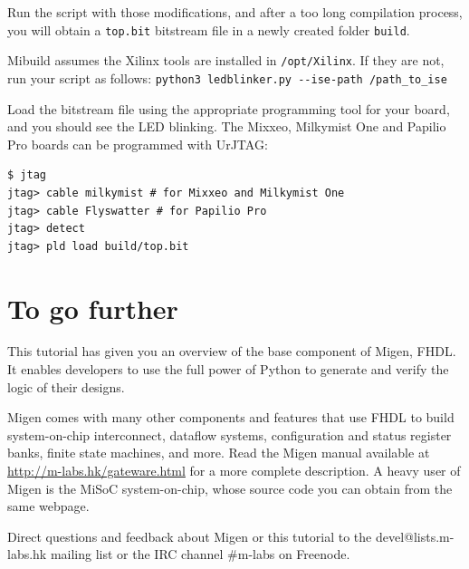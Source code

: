 \documentclass[11pt]{paper}
\begin{document}
Run the script with those modifications, and after a too long compilation process, you will obtain a \verb!top.bit! bitstream file in a newly created folder \verb!build!.

Mibuild assumes the Xilinx tools are installed in \verb!/opt/Xilinx!. If they are not, run your script as follows: \verb!python3 ledblinker.py --ise-path /path_to_ise!

Load the bitstream file using the appropriate programming tool for your board, and you should see the LED blinking. The Mixxeo, Milkymist One and Papilio Pro boards can be programmed with UrJTAG:

\begin{verbatim}
$ jtag
jtag> cable milkymist # for Mixxeo and Milkymist One
jtag> cable Flyswatter # for Papilio Pro
jtag> detect
jtag> pld load build/top.bit
\end{verbatim}

\section{To go further}
This tutorial has given you an overview of the base component of Migen, FHDL. It enables developers to use the full power of Python to generate and verify the logic of their designs.

Migen comes with many other components and features that use FHDL to build system-on-chip interconnect, dataflow systems, configuration and status register banks, finite state machines, and more. Read the Migen manual available at \url{http://m-labs.hk/gateware.html} for a more complete description. A heavy user of Migen is the MiSoC system-on-chip, whose source code you can obtain from the same webpage.

Direct questions and feedback about Migen or this tutorial to the devel@lists.m-labs.hk mailing list or the IRC channel \#m-labs on Freenode.
\end{document}
